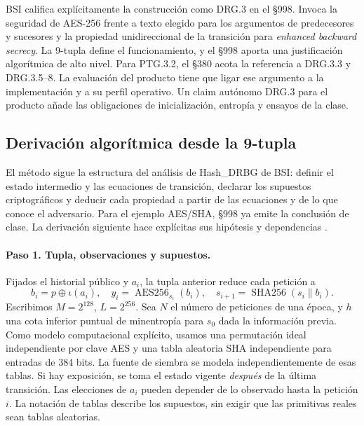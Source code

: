 \documentclass[11pt,a4paper]{article}
\newcommand{\AES}{\operatorname{AES256}}
\newcommand{\SHA}{\operatorname{SHA256}}
\begin{document}
BSI califica explícitamente la construcción como DRG.3 en el §998.
Invoca la seguridad de AES-256 frente a texto elegido para los
argumentos de predecesores y sucesores y la propiedad unidireccional
de la transición para \emph{enhanced backward secrecy}.
La 9-tupla define el funcionamiento, y el §998 aporta una
justificación algorítmica de alto nivel. Para PTG.3.2, el §380
acota la referencia a DRG.3.3 y DRG.3.5--8. La evaluación del
producto tiene que ligar ese argumento a la implementación y a
su perfil operativo. Un claim autónomo DRG.3 para el producto añade
las obligaciones de inicialización, entropía y ensayos de la clase.

\subsection{Derivación algorítmica desde la 9-tupla}
\label{sec:ais-drgg-derive}
El método sigue la estructura del análisis de Hash\_DRBG de BSI:
definir el estado intermedio y las ecuaciones de transición, declarar
los supuestos criptográficos y deducir cada propiedad a partir de
las ecuaciones y de lo que conoce el adversario. Para el ejemplo
AES/SHA, §998 ya emite la conclusión de clase. La derivación
siguiente hace explícitas sus hipótesis y dependencias
\cite[§§1033--1046, 1053--1075 y 996--998]{ais}.

\paragraph{Paso 1. Tupla, observaciones y supuestos.}
Fijados el historial público y \(a_i\), la tupla anterior reduce
cada petición a
\[
  b_i=p\oplus\iota(a_i),\quad
  y_i=\AES_{s_i}(b_i),\quad s_{i+1}=\SHA(s_i\|b_i).
\]
Escribimos \(M=2^{128}\), \(L=2^{256}\). Sea \(N\) el número de
peticiones de una época, y \(h\) una cota inferior puntual de
minentropía para \(s_0\) dada la información previa. Como modelo
computacional explícito, usamos una permutación ideal independiente
por clave AES y una tabla aleatoria SHA independiente para entradas
de 384 bits. La fuente de siembra se modela independientemente de
esas tablas. Si hay exposición, se toma el estado vigente
\emph{después} de la última transición. Las elecciones de \(a_i\)
pueden depender de lo observado hasta la petición \(i\).
La notación de tablas describe los supuestos, sin exigir que las
primitivas reales sean tablas aleatorias.
\end{document}
